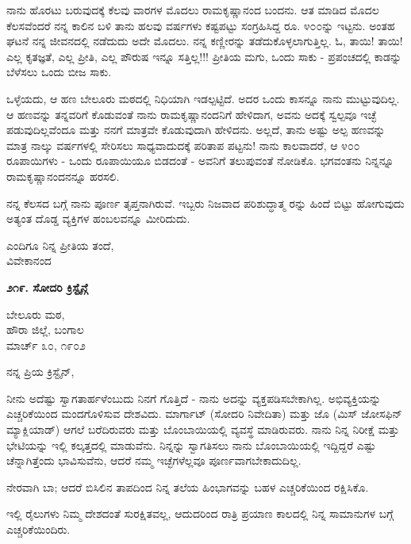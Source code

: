 ನಾನು ಹೊರಟು ಬರುವುದಕ್ಕೆ ಕೆಲವು ವಾರಗಳ ಮೊದಲು ರಾಮಕೃಷ್ಣಾನಂದ ಬಂದನು. ಆತ ಮಾಡಿದ ಮೊದಲ ಕೆಲಸವೆಂದರೆ ನನ್ನ ಕಾಲಿನ ಬಳಿ ತಾನು ಹಲವು ವರ್ಷಗಳು ಕಷ್ಟಪಟ್ಟು ಸಂಗ್ರಹಿಸಿದ್ದ ರೂ. ೪೦೦ನ್ನು ಇಟ್ಟನು. ಅಂತಹ ಘಟನೆ ನನ್ನ ಜೀವನದಲ್ಲಿ ನಡೆದುದು ಅದೇ ಮೊದಲು. ನನ್ನ ಕಣ್ಣೀರನ್ನು ತಡೆದುಕೊಳ್ಳಲಾಗುತ್ತಿಲ್ಲ. ಓ, ತಾಯಿ! ತಾಯಿ! ಎಲ್ಲ ಕೃತಜ್ಞತೆ, ಎಲ್ಲ ಪ್ರೀತಿ, ಎಲ್ಲ ಪೌರುಷ ಇನ್ನೂ ಸತ್ತಿಲ್ಲ!!! ಪ್ರೀತಿಯ ಮಗು, ಒಂದು ಸಾಕು - ಪ್ರಪಂಚದಲ್ಲಿ ಕಾಡನ್ನು ಬೆಳೆಸಲು ಒಂದು ಬೀಜ ಸಾಕು.

ಒಳ್ಳೆಯದು, ಆ ಹಣ ಬೇಲೂರು ಮಠದಲ್ಲಿ ನಿಧಿಯಾಗಿ ಇಡಲ್ಪಟ್ಟಿದೆ. ಅದರ ಒಂದು ಕಾಸನ್ನೂ ನಾನು ಮುಟ್ಟುವುದಿಲ್ಲ. ಆ ಹಣವನ್ನು ತನ್ನವರಿಗೆ ಕೊಡುವಂತೆ ನಾನು ರಾಮಕೃಷ್ಣಾನಂದನಿಗೆ ಹೇಳಿದಾಗ, ಅವನು ಅದಕ್ಕೆ ಸ್ವಲ್ಪವೂ ಇಚ್ಛೆ ಪಡುವುದಿಲ್ಲವೆಂದೂ ಮತ್ತು ನನಗೆ ಮಾತ್ರವೇ ಕೊಡುವುದಾಗಿ ಹೇಳಿದನು. ಅಲ್ಲದೆ, ತಾನು ಅಷ್ಟು ಅಲ್ಪ ಹಣವನ್ನು ಮಾತ್ರ ನಾಲ್ಕು ವರ್ಷಗಳಲ್ಲಿ ಸೇರಿಸಲು ಸಾಧ್ಯವಾದುದಕ್ಕೆ ಪರಿತಾಪ ಪಟ್ಟನು! ನಾನು ಕಾಲವಾದರೆ, ಆ ೪೦೦ ರೂಪಾಯಿಗಳು - ಒಂದು ರೂಪಾಯಿಯೂ ಬಿಡದಂತೆ - ಅವನಿಗೆ ತಲುಪುವಂತೆ ನೋಡಿಕೊ. ಭಗವಂತನು ನಿನ್ನನ್ನೂ ರಾಮಕೃಷ್ಣಾನಂದನನ್ನೂ ಹರಸಲಿ.

ನನ್ನ ಕೆಲಸದ ಬಗ್ಗೆ ನಾನು ಪೂರ್ಣ ತೃಪ್ತನಾಗಿರುವೆ. ಇಬ್ಬರು ನಿಜವಾದ ಪರಿಶುದ್ಧಾತ್ಮ ರನ್ನು ಹಿಂದೆ ಬಿಟ್ಟು ಹೋಗುವುದು ಅತ್ಯಂತ ದೊಡ್ಡ ವ್ಯಕ್ತಿಗಳ ಹಂಬಲವನ್ನೂ ಮೀರಿದುದು.

\begin{flushright}
ಎಂದಿಗೂ ನಿನ್ನ ಪ್ರೀತಿಯ ತಂದೆ,\\ವಿವೇಕಾನಂದ
\end{flushright}

\begin{center}
\textbf{೨೧೯. ಸೋದರಿ ಕ್ರಿಸ್ಟೈನ್ಗೆ}
\end{center}

\begin{flushright}
ಬೇಲೂರು ಮಠ,\\ಹೌರಾ ಜಿಲ್ಲೆ, ಬಂಗಾಲ\\ಮಾರ್ಚ್ ೩೦, ೧೯೦೨
\end{flushright}

ನನ್ನ ಪ್ರಿಯ ಕ್ರಿಸ್ಟೈನ್,

ನೀನು ಅದೆಷ್ಟು ಸ್ವಾಗತಾರ್ಹಳೆಂಬುದು ನಿನಗೆ ಗೊತ್ತಿದೆ - ನಾನು ಅದನ್ನು ವ್ಯಕ್ತಪಡಿಸಬೇಕಾಗಿಲ್ಲ. ಅಭಿವ್ಯಕ್ತಿಯನ್ನು ಎಚ್ಚರಿಕೆಯಿಂದ ಮಂದಗೊಳಿಸುವ ದೇಶವಿದು. ಮಾರ್ಗಾಟ್ (ಸೋದರಿ ನಿವೇದಿತಾ) ಮತ್ತು ಜೊ (ಮಿಸ್ ಜೋಸಫಿನ್ ಮ್ಯಾಕ್ಲಿಯಾಡ್) ಆಗಲೆ ಬರೆದಿರುವರು ಮತ್ತು ಬೊಂಬಾಯಿಯಲ್ಲಿ ವ್ಯವಸ್ಥೆ ಮಾಡಿರುವರು. ನಾನು ನಿನ್ನ ನಿರೀಕ್ಷೆ ಮತ್ತು ಭೇಟಿಯನ್ನು ಇಲ್ಲಿ ಕಲ್ಕತ್ತದಲ್ಲಿ ಮಾಡುವೆನು. ನಿನ್ನನ್ನು ಸ್ವಾಗತಿಸಲು ನಾನು ಬೊಂಬಾಯಿಯಲ್ಲಿ ಇದ್ದಿದ್ದರೆ ಎಷ್ಟು ಚೆನ್ನಾಗಿತ್ತೆಂದು ಭಾವಿಸುವೆನು, ಆದರೆ ನಮ್ಮ ಇಚ್ಛೆಗಳೆಲ್ಲವೂ ಪೂರ್ಣವಾಗಬೇಕಾದುದಿಲ್ಲ.

ನೇರವಾಗಿ ಬಾ; ಆದರೆ ಬಿಸಿಲಿನ ತಾಪದಿಂದ ನಿನ್ನ ತಲೆಯ ಹಿಂಭಾಗವನ್ನು ಬಹಳ ಎಚ್ಚರಿಕೆಯಿಂದ ರಕ್ಷಿಸಿಕೊ.

ಇಲ್ಲಿ ರೈಲುಗಳು ನಿಮ್ಮ ದೇಶದಂತೆ ಸುರಕ್ಷಿತವಲ್ಲ, ಆದುದರಿಂದ ರಾತ್ರಿ ಪ್ರಯಾಣ ಕಾಲದಲ್ಲಿ ನಿನ್ನ ಸಾಮಾನುಗಳ ಬಗ್ಗೆ ಎಚ್ಚರಿಕೆಯಿಂದಿರು.

